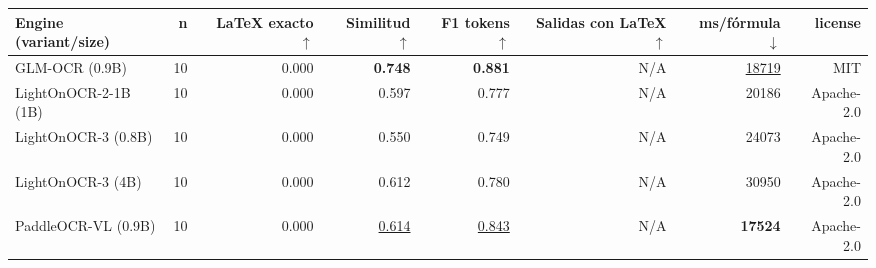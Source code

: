 \documentclass[border=2pt]{standalone}
\begin{document}
\begin{tabular}{lrrrrrrr}
\toprule
Engine (variant/size) & n & LaTeX exacto $\uparrow$ & Similitud $\uparrow$ & F1 tokens $\uparrow$ & Salidas con LaTeX $\uparrow$ & ms/fórmula $\downarrow$ & license \\
\midrule
GLM-OCR (0.9B) & 10 & 0.000 & \textbf{0.748} & \textbf{0.881} & N/A & \underline{18719} & MIT \\
LightOnOCR-2-1B (1B) & 10 & 0.000 & 0.597 & 0.777 & N/A & 20186 & Apache-2.0 \\
LightOnOCR-3 (0.8B) & 10 & 0.000 & 0.550 & 0.749 & N/A & 24073 & Apache-2.0 \\
LightOnOCR-3 (4B) & 10 & 0.000 & 0.612 & 0.780 & N/A & 30950 & Apache-2.0 \\
PaddleOCR-VL (0.9B) & 10 & 0.000 & \underline{0.614} & \underline{0.843} & N/A & \textbf{17524} & Apache-2.0 \\
\bottomrule
\end{tabular}
\par{}
\end{document}
